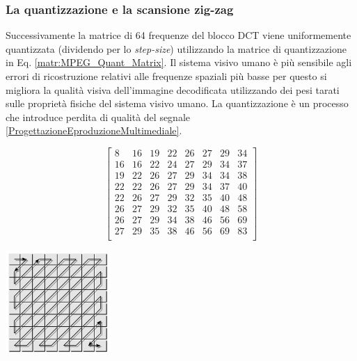 


\subsubsection{La quantizzazione e la scansione zig-zag}
Successivamente la matrice di 64 frequenze del blocco DCT viene uniformemente quantizzata (dividendo per lo \textit{step-size}) utilizzando la matrice di quantizzazione in Eq. \ref{matr:MPEG_Quant_Matrix}. Il sistema visivo umano è più sensibile agli errori di ricostruzione relativi alle frequenze spaziali più basse per questo si migliora la qualità visiva dell'immagine decodificata utilizzando dei pesi tarati sulle proprietà fisiche del sistema visivo umano. La quantizzazione è un processo che introduce perdita di qualità del segnale \ref{ProgettazioneEproduzioneMultimediale}.

\begin{minipage}{0.5\linewidth}
	\begin{equation} \label{matr:MPEG_Quant_Matrix}
		\begin{bmatrix} 
			8 & 16 & 19 & 22 & 26 & 27 & 29 & 34\\
			16 & 16 & 22 & 24 & 27 & 29 & 34 & 37\\
			19 & 22 & 26 & 27 & 29 & 34 & 34 & 38\\
			22 & 22 & 26 & 27 & 29 & 34 & 37 & 40\\
			22 & 26 & 27 & 29 & 32 & 35 & 40 & 48\\
			26 & 27 & 29 & 32 & 35 & 40 & 48 & 58\\
			26 & 27 & 29 & 34 & 38 & 46 & 56 & 69\\
			27 & 29 & 35 & 38 & 46 & 56 & 69 & 83\\
		\end{bmatrix}
	\end{equation}
	\vfill
\end{minipage}%
\begin{minipage}{0.5\linewidth}
	\centering
	\includegraphics[width=4cm]{immagini/JPEG_ZigZag}
	\label{fig:JPEG_ZigZag}
\end{minipage}%

